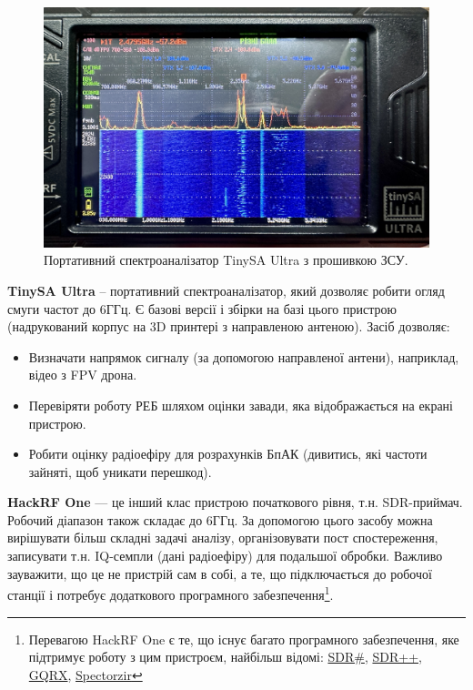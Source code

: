 \documentclass{article}
\begin{document}
\begin{figure}[H]
\centering
\includegraphics[width=0.7\linewidth]{images/tinysa.jpg}
\caption{\label{fig:tinysa}Портативний спектроаналізатор TinySA Ultra з прошивкою ЗСУ.}
\end{figure}

\textbf{TinySA Ultra} -- портативний спектроаналізатор, який дозволяє робити огляд смуги частот до 6ГГц. Є базові версії і збірки на базі цього пристрою (надрукований корпус на 3D принтері з направленою антеною). Засіб дозволяє:

\begin{itemize}[noitemsep, topsep=8pt]
\item Визначати напрямок сигналу (за допомогою направленої антени), наприклад, відео з FPV дрона.
\item Перевіряти роботу РЕБ шляхом оцінки завади, яка відображається на екрані пристрою.
\item Робити оцінку радіоефіру для розрахунків БпАК (дивитись, які частоти зайняті, щоб уникати перешкод).
\end{itemize}


\textbf{HackRF One} --- це інший клас пристрою початкового рівня, т.н. SDR-приймач. Робочий діапазон також складає до 6ГГц. За допомогою цього засобу можна вирішувати більш складні задачі аналізу, організовувати пост спостереження, записувати т.н. IQ-семпли (дані радіоефіру) для подальшої обробки. Важливо зауважити, що це не пристрій сам в собі, а те, що підключається до робочої станції і потребує додаткового програмного забезпечення\footnote{Перевагою HackRF One є те, що існує багато програмного забезпечення, яке підтримує роботу з цим пристроєм, найбільш відомі: \href{https://airspy.com/download/}{SDR\#}, \href{https://www.sdrpp.org/}{SDR++}, \href{https://www.gqrx.dk/}{GQRX}, \href{https://spectrozir.com/}{Spectorzir}}.
\end{document}
